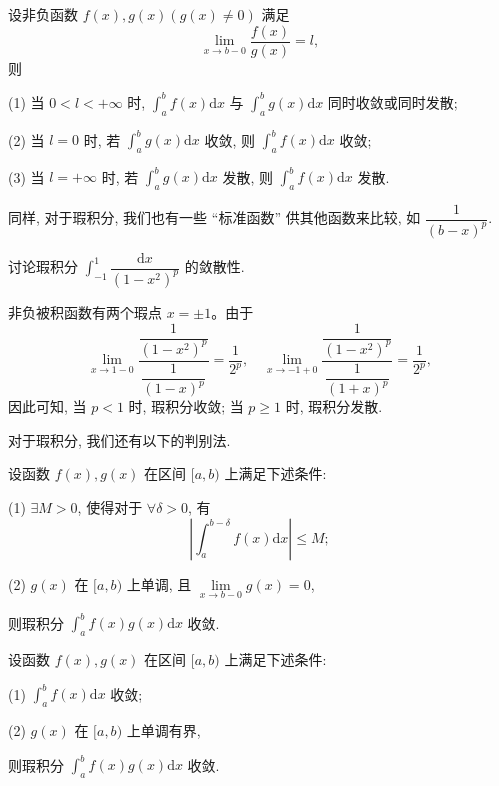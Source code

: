 \begin{corollary}\label{corollary:ma-8-source-53}
设非负函数 $f(x),g(x)(g(x)\ne0)$ 满足
\[
  \lim_{x\to b-0}\frac{f(x)}{g(x)}=l,
\]
则

(1) 当 $0<l<+\infty$ 时, $\int_a^b f(x)\mathrm dx$ 与 $\int_a^b g(x)\mathrm dx$ 同时收敛或同时发散;

(2) 当 $l=0$ 时, 若 $\int_a^b g(x)\mathrm dx$ 收敛, 则 $\int_a^b f(x)\mathrm dx$ 收敛;

(3) 当 $l=+\infty$ 时, 若 $\int_a^b g(x)\mathrm dx$ 发散, 则 $\int_a^b f(x)\mathrm dx$ 发散.
\end{corollary}

同样, 对于瑕积分, 我们也有一些 ``标准函数'' 供其他函数来比较, 如 $\dfrac1{(b-x)^p}$.

\begin{example}\label{example:ma-8-3-4}
讨论瑕积分 $\int_{-1}^1\dfrac{\mathrm dx}{(1-x^2)^p}$ 的敛散性.
\end{example}


\begin{solve}
非负被积函数有两个瑕点 $x=\pm1$。由于
\[
  \lim_{x\to1-0}
  \frac{\dfrac1{(1-x^2)^p}}{\dfrac1{(1-x)^p}}
  =
  \frac1{2^p},\quad
  \lim_{x\to-1+0}
  \frac{\dfrac1{(1-x^2)^p}}{\dfrac1{(1+x)^p}}
  =
  \frac1{2^p},
\]
因此可知, 当 $p<1$ 时, 瑕积分收敛; 当 $p\geq1$ 时, 瑕积分发散.

对于瑕积分, 我们还有以下的判别法.
\end{solve}


\begin{theorem}[{狄利克雷判别法}]\label{theorem:ma-8-3-3}
设函数 $f(x),g(x)$ 在区间 $[a,b)$ 上满足下述条件:

(1) $\exists M>0$, 使得对于 $\forall\delta>0$, 有
\[
  \left|\int_a^{b-\delta}f(x)\mathrm dx\right|\leq M;
\]

(2) $g(x)$ 在 $[a,b)$ 上单调, 且 $\lim\limits_{x\to b-0}g(x)=0$,

则瑕积分 $\int_a^b f(x)g(x)\mathrm dx$ 收敛.
\end{theorem}


\begin{theorem}[{阿贝尔判别法}]\label{theorem:ma-8-3-4}
设函数 $f(x),g(x)$ 在区间 $[a,b)$ 上满足下述条件:

(1) $\int_a^b f(x)\mathrm dx$ 收敛;

(2) $g(x)$ 在 $[a,b)$ 上单调有界,

则瑕积分 $\int_a^b f(x)g(x)\mathrm dx$ 收敛.
\end{theorem}


